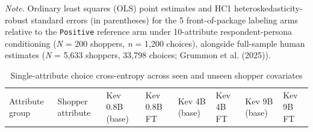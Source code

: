 \documentclass[
  letterpaper,
  DIV=11,
  numbers=noendperiod]{scrartcl}
\begin{document}
\emph{Note.} Ordinary least squares (OLS) point estimates and HC1
heteroskedasticity-robust standard errors (in parentheses) for the 5
front-of-package labeling arms relative to the \texttt{Positive}
reference arm under 10-attribute respondent-persona conditioning
(\emph{N} = 200 shoppers, \emph{n} = 1,200 choices), alongside
full-sample human estimates (\emph{N} = 5,633 shoppers, 33,798 choices;
Grummon et al. (2025)).

\nexttablesize{\scriptsize}
{\def\LTcaptype{apptbl}
\begin{longtable}[]{@{}
  >{\raggedright\arraybackslash}p{}
  >{\raggedright\arraybackslash}p{}
  >{\raggedleft\arraybackslash}p{}
  >{\raggedleft\arraybackslash}p{}
  >{\raggedleft\arraybackslash}p{}
  >{\raggedleft\arraybackslash}p{}
  >{\raggedleft\arraybackslash}p{}
  >{\raggedleft\arraybackslash}p{}@{}}
\caption{{\label{apptbl-grummon2025-personas}}Single-attribute choice
cross-entropy across seen and unseen shopper covariates}\tabularnewline
\toprule\noalign{}
\begin{minipage}[b]{\linewidth}\raggedright
Attribute group
\end{minipage} & \begin{minipage}[b]{\linewidth}\raggedright
Shopper attribute
\end{minipage} & \begin{minipage}[b]{\linewidth}\raggedleft
Kev 0.8B (base)
\end{minipage} & \begin{minipage}[b]{\linewidth}\raggedleft
Kev 0.8B FT
\end{minipage} & \begin{minipage}[b]{\linewidth}\raggedleft
Kev 4B (base)
\end{minipage} & \begin{minipage}[b]{\linewidth}\raggedleft
Kev 4B FT
\end{minipage} & \begin{minipage}[b]{\linewidth}\raggedleft
Kev 9B (base)
\end{minipage} & \begin{minipage}[b]{\linewidth}\raggedleft
Kev 9B FT
\end{minipage} \\

\end{longtable}}
\end{document}
